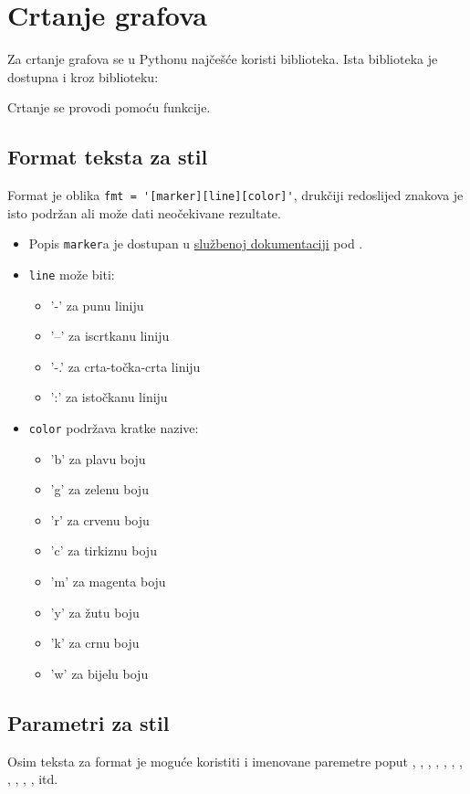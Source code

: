 \section{Crtanje grafova}

Za crtanje grafova se u Pythonu najčešće koristi 
biblioteka. Ista biblioteka je dostupna i kroz  biblioteku:



Crtanje se provodi pomoću  funkcije.



\subsection{Format teksta za stil}

Format je oblika \verb|fmt = '[marker][line][color]'|, drukčiji redoslijed
znakova je isto podržan ali može dati neočekivane rezultate.

\begin{itemize}
    \item Popis \verb|marker|a je dostupan u \href{https://matplotlib.org/stable/api}{službenoj dokumentaciji} pod \href{https://matplotlib.org/stable/api/markers_api.html}{}.
    \item \verb|line| može biti:
    \begin{itemize}
        \item '-' za punu liniju
        \item '--' za iscrtkanu liniju
        \item '-.' za crta-točka-crta liniju
        \item ':' za istočkanu liniju
    \end{itemize}
    \item \verb|color| podržava kratke nazive:
    \begin{itemize}
        \item 'b' za plavu boju
        \item 'g' za zelenu boju
        \item 'r' za crvenu boju
        \item 'c' za tirkiznu boju
        \item 'm' za magenta boju
        \item 'y' za žutu boju
        \item 'k' za crnu boju
        \item 'w' za bijelu boju
    \end{itemize}
\end{itemize}

\subsection{Parametri za stil}

Osim teksta za format je moguće koristiti i imenovane paremetre poput
, , , ,
, , ,
, ,
, , itd.
